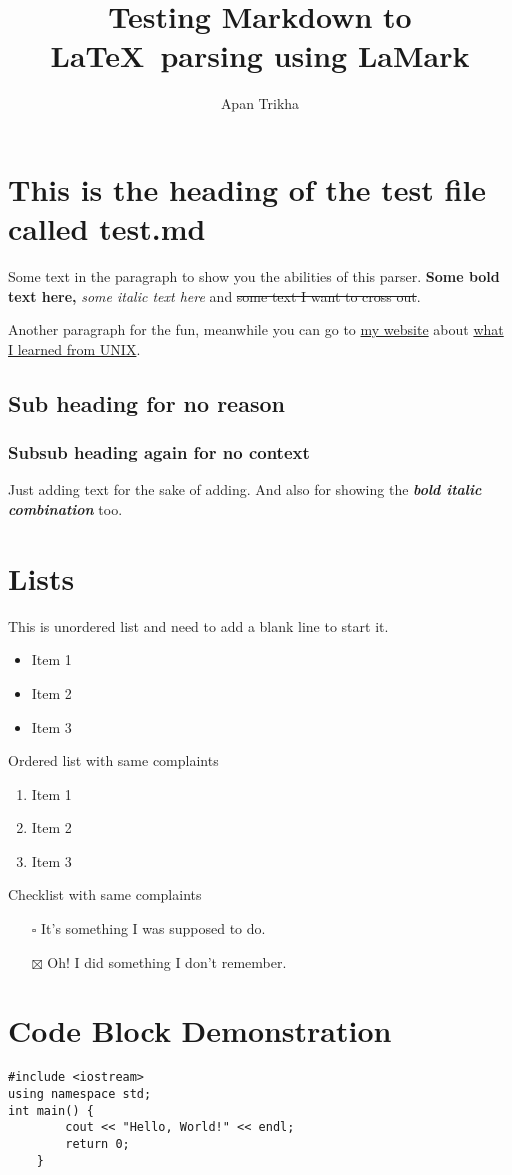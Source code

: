 \documentclass{article}
\title{Testing Markdown to \LaTeX\ parsing using LaMark}
\author{Apan Trikha}
\begin{document}
\section{This is the heading of the test file called test.md}
Some text in the paragraph to show you the abilities of this parser. \textbf{Some bold text here,} \textit{some italic text here} and \st{some text I want to cross out}.

Another paragraph for the fun, meanwhile you can go to \href{https://pixeltrik.vercel.app/}{my website} about \href{https://pixeltrik.vercel.app/blogs/on-most-people-teaching-unix}{what I learned from UNIX}.

\subsection{Sub heading for no reason}
\subsubsection{Subsub heading again for no context}
Just adding text for the sake of adding. And also for showing the \textit{\textbf{bold italic combination}} too.

\section{Lists}
This is unordered list and need to add a blank line to start it.

\begin{itemize}
	\item Item 1
	\item Item 2
	\item Item 3
\end{itemize}

Ordered list with same complaints

\begin{enumerate}
	\item Item 1
	\item Item 2
	\item Item 3
\end{enumerate}

Checklist with same complaints

\begin{itemize}
	\item[$\square$]  It's something I was supposed to do.
	\item[$\boxtimes$]  Oh! I did something I don't remember.
\end{itemize}

\section{Code Block Demonstration}
\begin{verbatim}
#include <iostream>
using namespace std;
int main() {
        cout << "Hello, World!" << endl;
        return 0;
    }
\end{verbatim}
\end{document}
